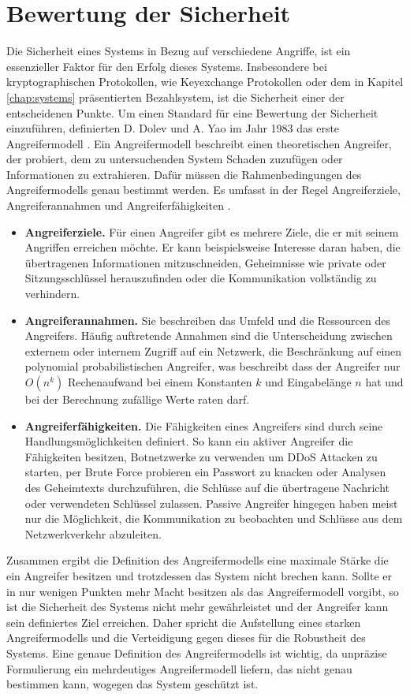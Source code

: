 \documentclass[
	fontsize=11pt,
	headings=small,
	parskip=half,           %
	bibliography=totoc,
	numbers=noenddot,       %
	open=any,               %
]{scrreprt}
\begin{document}
\section{Bewertung der Sicherheit}
\label{sec:auswertungSecurity}
Die Sicherheit eines Systems in Bezug auf verschiedene Angriffe, ist ein essenzieller Faktor für den Erfolg dieses Systems. Insbesondere bei kryptographischen Protokollen, wie Keyexchange Protokollen oder dem in Kapitel \ref{chap:systems} präsentierten Bezahlsystem, ist die Sicherheit einer der entscheidenen Punkte. Um einen Standard für eine Bewertung der Sicherheit einzuführen, definierten D. Dolev und A. Yao im Jahr 1983 das erste Angreifermodell \cite{am-dolev1983security}. Ein Angreifermodell beschreibt einen theoretischen Angreifer, der probiert, dem zu untersuchenden System Schaden zuzufügen oder Informationen zu extrahieren. Dafür müssen die Rahmenbedingungen des Angreifermodells genau bestimmt werden. Es umfasst in der Regel Angreiferziele, Angreiferannahmen und Angreiferfähigkeiten \cite{am-do2019role}. 
\begin{itemize}
    \item \textbf{Angreiferziele.} Für einen Angreifer gibt es mehrere Ziele, die er mit seinem Angriffen erreichen möchte. Er kann beispielsweise Interesse daran haben, die übertragenen Informationen mitzuschneiden, Geheimnisse wie private oder Sitzungsschlüssel herauszufinden oder die Kommunikation vollständig zu verhindern. 
    \item \textbf{Angreiferannahmen.} Sie beschreiben das Umfeld und die Ressourcen des Angreifers. Häufig auftretende Annahmen sind die Unterscheidung zwischen externem oder internem Zugriff auf ein Netzwerk, die Beschränkung auf einen polynomial probabilistischen Angreifer, was beschreibt dass der Angreifer nur $O(n^k)$ Rechenaufwand bei einem Konstanten $k$ und Eingabelänge $n$ hat und bei der Berechnung zufällige Werte raten darf.
    \item \textbf{Angreiferfähigkeiten.} Die Fähigkeiten eines Angreifers sind durch seine Handlungsmöglichkeiten definiert. So kann ein aktiver Angreifer die Fähigkeiten besitzen, Botnetzwerke zu verwenden um DDoS Attacken zu starten, per Brute Force probieren ein Passwort zu knacken oder Analysen des Geheimtexts durchzuführen, die Schlüsse auf die übertragene Nachricht oder verwendeten Schlüssel zulassen. Passive Angreifer hingegen haben meist nur die Möglichkeit, die Kommunikation zu beobachten und Schlüsse aus dem Netzwerkverkehr abzuleiten.
\end{itemize} 
Zusammen ergibt die Definition des Angreifermodells eine maximale Stärke die ein Angreifer besitzen und trotzdessen das System nicht brechen kann. Sollte er in nur wenigen Punkten mehr Macht besitzen als das Angreifermodell vorgibt, so ist die Sicherheit des Systems nicht mehr gewährleistet und der Angreifer kann sein definiertes Ziel erreichen. Daher spricht die Aufstellung eines starken Angreifermodells und die Verteidigung gegen dieses für die Robustheit des Systems. Eine genaue Definition des Angreifermodells ist wichtig, da unpräzise Formulierung ein mehrdeutiges Angreifermodell liefern, das nicht genau bestimmen kann, wogegen das System geschützt ist.
\end{document}
